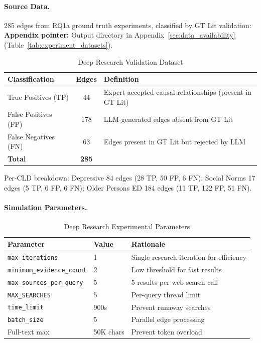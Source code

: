 \paragraph{Source Data.}
285 edges from RQ1a ground truth experiments, classified by GT Lit validation:
\textbf{Appendix pointer:} Output directory in Appendix~\ref{sec:data_availability} (Table~\ref{tab:experiment_datasets}).

\begin{table}[H]
\centering
\caption{Deep Research Validation Dataset}
\label{tab:dr_dataset}
\footnotesize
\begin{tabular}{@{}l c l@{}}
\toprule
\textbf{Classification} & \textbf{Edges} & \textbf{Definition} \\
\midrule
True Positives (TP) & 44 & Expert-accepted causal relationships (present in GT Lit) \\
False Positives (FP) & 178 & LLM-generated edges absent from GT Lit \\
False Negatives (FN) & 63 & Edges present in GT Lit but rejected by LLM \\
\midrule
\textbf{Total} & \textbf{285} & \\
\bottomrule
\end{tabular}
\end{table}

Per-CLD breakdown: Depressive 84 edges (28 TP, 50 FP, 6 FN); Social Norms 17 edges (5 TP, 6 FP, 6 FN); Older Persons ED 184 edges (11 TP, 122 FP, 51 FN).

\paragraph{Simulation Parameters.}
\begin{table}[H]
\centering
\caption{Deep Research Experimental Parameters}
\label{tab:dr_params}
\footnotesize
\begin{tabular}{@{}l l l@{}}
\toprule
\textbf{Parameter} & \textbf{Value} & \textbf{Rationale} \\
\midrule
\texttt{max\_iterations} & 1 & Single research iteration for efficiency \\
\texttt{minimum\_evidence\_count} & 2 & Low threshold for fast results \\
\texttt{max\_sources\_per\_query} & 5 & 5 results per web search call \\
\texttt{MAX\_SEARCHES} & 5 & Per-query thread limit \\
\texttt{time\_limit} & 900s & Prevent runaway searches \\
\texttt{batch\_size} & 5 & Parallel edge processing \\
Full-text max & 50K chars & Prevent token overload \\
\bottomrule
\end{tabular}
\end{table}

